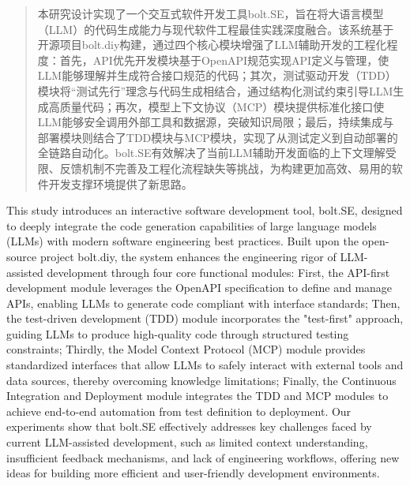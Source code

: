 

\begin{abstract}
  本研究设计实现了一个交互式软件开发工具bolt.SE，旨在将大语言模型（LLM）的代码生成能力与现代软件工程最佳实践深度融合。该系统基于开源项目bolt.diy构建，通过四个核心模块增强了LLM辅助开发的工程化程度：首先，API优先开发模块基于OpenAPI规范实现API定义与管理，使LLM能够理解并生成符合接口规范的代码；其次，测试驱动开发（TDD）模块将“测试先行”理念与代码生成相结合，通过结构化测试约束引导LLM生成高质量代码；再次，模型上下文协议（MCP）模块提供标准化接口使LLM能够安全调用外部工具和数据源，突破知识局限；最后，持续集成与部署模块则结合了TDD模块与MCP模块，实现了从测试定义到自动部署的全链路自动化。bolt.SE有效解决了当前LLM辅助开发面临的上下文理解受限、反馈机制不完善及工程化流程缺失等挑战，为构建更加高效、易用的软件开发支撑环境提供了新思路。
\end{abstract}

\begin{abstract*}
  This study introduces an interactive software development tool, bolt.SE, designed to deeply integrate the code generation capabilities of large language models (LLMs) with modern software engineering best practices. Built upon the open-source project bolt.diy, the system enhances the engineering rigor of LLM-assisted development through four core functional modules: First, the API-first development module leverages the OpenAPI specification to define and manage APIs, enabling LLMs to generate code compliant with interface standards; Then, the test-driven development (TDD) module incorporates the "test-first" approach, guiding LLMs to produce high-quality code through structured testing constraints; Thirdly, the Model Context Protocol (MCP) module provides standardized interfaces that allow LLMs to safely interact with external tools and data sources, thereby overcoming knowledge limitations; Finally, the Continuous Integration and Deployment module integrates the TDD and MCP modules to achieve end-to-end automation from test definition to deployment. Our experiments show that bolt.SE effectively addresses key challenges faced by current LLM-assisted development, such as limited context understanding, insufficient feedback mechanisms, and lack of engineering workflows, offering new ideas for building more efficient and user-friendly development environments.
\end{abstract*}
